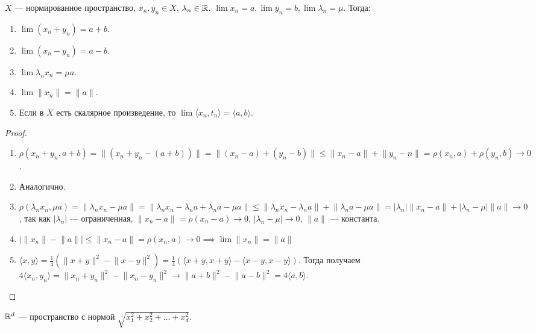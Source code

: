 \begin{theorem}
    $X$ --- нормированное пространство,  $x_n, y_n \in X$,  $\lambda_n \in \mathbb{R}$.  $\lim x_n = a, \lim y_n = b, \lim \lambda_n = \mu$. Тогда:
     \begin{enumerate}
         \item $\lim (x_n + y_n) = a+b$.
         \item  $\lim(x_n - y_n) = a-b$.
         \item  $\lim \lambda_nx_n = \mu a$.
         \item  $\lim \lVert x_n\rVert = \lVert a \rVert$.
         \item  Если в  $X$ есть скалярное произведение, то  $\lim \langle x_n, t_n \rangle = \langle a, b \rangle$.
    \end{enumerate}
\end{theorem}
\begin{proof}
    \begin{enumerate}
        \item $\rho(x_n+y_n, a+b) = \lVert (x_n+y_n - (a+b)) \rVert = \lVert (x_n-a) + (y_n-b) \rVert \le \lVert x_n - a \rVert + \lVert y_n - n \rVert = \rho(x_n, a) + \rho(y_n, b) \to 0$.
        \item Аналогично.
        \item $\rho(\lambda_nx_n, \mu a) = \lVert \lambda_n x_n - \mu a\rVert = \lVert \lambda_n x_n - \lambda_n a + \lambda_n a - \mu a \rVert \le \lVert \lambda_n x_n - \lambda_n a \rVert + \lVert \lambda_n a - \mu a \rVert = |\lambda_n| \lVert x_n - a \rVert + |\lambda_n -\mu| \lVert a \rVert \to 0$, так как $|\lambda_n|$ --- ограниченная, $\lVert x_n - a \rVert = \rho(x_n - a) \to 0$,  $|\lambda_n -\mu| \to 0$, $\lVert a \rVert$ --- константа.  
        \item $| \lVert x_n \rVert - \lVert a \rVert| \le \lVert x_n - a \rVert = \rho(x_n, a) \to 0 \implies \lim \lVert x_n \rVert = \lVert a \rVert$
        \item $\langle x, y \rangle = \frac{1}{4}(\lVert x+y \rVert^2 - \lVert x-y \rVert^2) = \frac{1}{4}(\langle x+y, x+y\rangle - \langle x-y, x-y\rangle)$. Тогда получаем $4 \langle x_n, y_n \rangle = \lVert x_n + y_n \rVert^2 - \lVert x_n - y_n \rVert^2 \to \lVert a + b \rVert^2 - \lVert a - b \rVert^2 = 4 \langle a, b \rangle$.
    \end{enumerate}
\end{proof}
\begin{definition}
    $\mathbb{R}^d$ --- пространство с нормой  $\sqrt{x_1^2 + x_2^2 + \ldots + x_d^2}$.
\end{definition}
